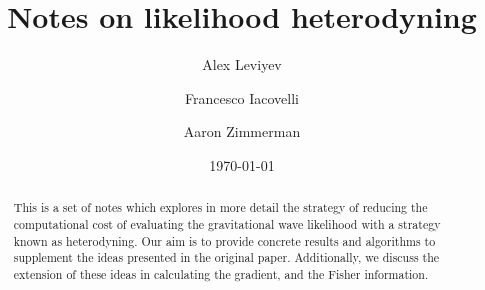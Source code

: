 \documentclass[10]{article}
\theoremstyle{definition}
\theoremstyle{plain}
\theoremstyle{remark}
\begin{document}
\title{Notes on likelihood heterodyning}

\author[1]{Alex Leviyev}
\author[4]{Francesco Iacovelli}
\author[1]{Aaron Zimmerman}
\date{\today}
\maketitle

\begin{abstract}
This is a set of notes which explores in more detail the strategy of reducing the computational cost of evaluating the gravitational wave likelihood with a strategy known as heterodyning.
Our aim is to provide concrete results and algorithms to supplement the ideas presented in the original paper.
Additionally, we discuss the extension of these ideas in calculating the gradient, and the Fisher information.


\end{abstract}

% 
% 
% 
% 
% 

\appendix




\end{document}
